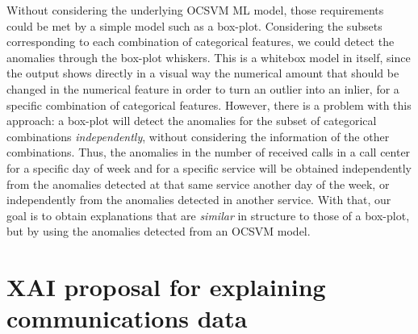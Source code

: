 
Without considering the underlying OCSVM ML model, those requirements could be met by a simple model such as a box-plot. Considering the subsets corresponding to each combination of categorical features, we could detect the anomalies through the box-plot whiskers. This is a whitebox model in itself, since the output shows directly in a visual way the numerical amount that should be changed in the numerical feature in order to turn an outlier into an inlier, for a specific combination of categorical features. However, there is a problem with this approach: a box-plot will detect the anomalies for the subset of categorical combinations \textit{independently}, without considering the information of the other combinations. Thus, the anomalies in the number of received calls in a call center for a specific day of week and for a specific service will be obtained independently from the anomalies detected at that same service another day of the week, or independently from the anomalies detected in another service. With that, our goal is to obtain explanations that are \textit{similar} in structure to those of a box-plot, but by using the anomalies detected from an OCSVM model.


\section{XAI proposal for explaining communications data}\label{sec:ch5-GeneralProposalComms}

